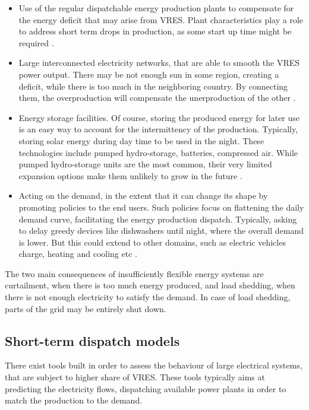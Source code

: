 \begin{itemize}
    \item Use of the regular dispatchable energy production plants to compensate for the energy deficit that may arise from VRES. Plant characteristics play a role to address short term drops in production, as some start up time might be required \cite{flexibility-storage-planning}.
    \item Large interconnected electricity networks, that are able to smooth the VRES power output. There may be not enough sun in some region, creating a deficit, while there is too much in the neighboring country. By connecting them, the overproduction will compensate the unerproduction of the other \cite{flexibility-connection}.
    \item Energy storage facilities. Of course, storing the produced energy for later use is an easy way to account for the intermittency of the production. Typically, storing solar energy during day time to be used in the night. These technologies include pumped hydro-storage, batteries, compressed air. While pumped hydro-storage units are the most common, their very limited expansion options make them unlikely to grow in the future \cite{flexibility-demdandside-forecasts-storage}.
    \item Acting on the demand, in the extent that it can change its shape by promoting policies to the end users. Such policies focus on flattening the daily demand curve, facilitating the energy production dispatch. Typically, asking to delay greedy devices like dishwashers until night, where the overall demand is lower. But this could extend to other domains, such as electric vehicles charge, heating and cooling etc \cite{flexibility-demdandside-forecasts-storage}.
\end{itemize}

The two main consequences of insufficiently flexible energy systems are curtailment, when there is too much energy produced, and load shedding, when there is not enough electricity to satisfy the demand. In case of load shedding, parts of the grid may be entirely shut down.

\subsection{Short-term dispatch models}

There exist tools built in order to assess the behaviour of large electrical systems, that are subject to higher share of VRES. These tools typically aims at predicting the electricity flows, dispatching available power plants in order to match the production to the demand. 

